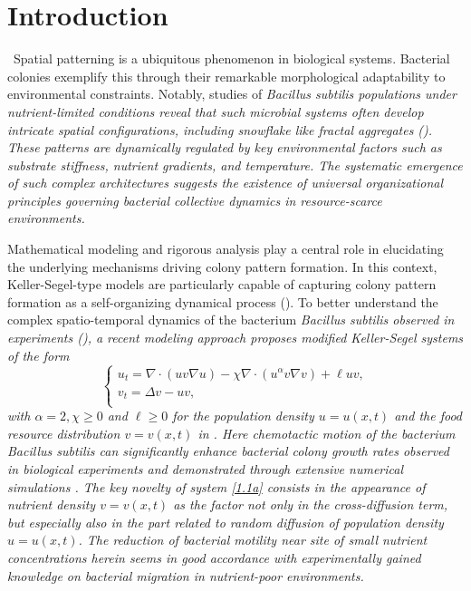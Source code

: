 \documentclass[12pt]{article}
\theoremstyle{plain}
\theoremstyle{definition}
\numberwithin{equation}{section}
\begin{document}
   \section{Introduction}
\setcounter{section}{1}\setcounter{equation}{0} \
Spatial patterning is a ubiquitous phenomenon in biological systems. Bacterial colonies exemplify this through their remarkable morphological adaptability to environmental constraints. Notably, studies of \it{Bacillus subtilis} \rm populations under nutrient-limited conditions reveal that such microbial systems often develop intricate spatial configurations, including snowflake like fractal aggregates (\cite{Fujikawa1992,Fujikawa1989,Fujikawa1990}). These patterns are dynamically regulated by key environmental factors such as substrate stiffness, nutrient gradients, and temperature. The systematic emergence of such complex architectures suggests the existence of universal organizational principles governing bacterial collective dynamics in resource-scarce environments.

Mathematical modeling and rigorous analysis play a central role in elucidating the underlying mechanisms driving colony pattern formation. In this context, Keller-Segel-type models are particularly  capable of capturing colony pattern formation as a self-organizing dynamical process (\cite{Herrero(1997),Hillen(2009)}). To  better understand the complex spatio-temporal dynamics
of the bacterium \it{Bacillus subtilis}  \rm  observed in experiments (\cite{Ohgiwari,Fujikawa1992,Fujikawa1989}), a
recent modeling approach   proposes modified Keller-Segel systems of the form
\begin{equation}\label{1.1a}
\left\{\begin{array}{ll}
		u_{t}=\nabla\cdot(uv\nabla u)-\chi \nabla\cdot(u^{\alpha}v\nabla v)+\ell uv,\\
		v_{t}=\Delta v-uv,\\
	\end{array}
		\right.
\end{equation}
with $\alpha=2, \chi\geq 0$ and $\ell\geq 0$ for the population density $u=u(x,t)$ and the food resource distribution $v=v(x,t)$ in \cite{Leyva2013,Plaza2019,Kawasaki1997}.
Here chemotactic motion of the bacterium \it{Bacillus subtilis} \rm can significantly enhance bacterial colony growth rates  observed in biological experiments and demonstrated through extensive numerical simulations \cite{Leyva2013,Plaza2019}.
 The key novelty of  system   \eqref{1.1a} consists in the appearance of nutrient density $v=v(x,t)$ as the factor not only in the cross-diffusion term, but especially also in the part related to random diffusion
of population density $u=u(x,t)$.
The reduction of bacterial motility near site of small nutrient concentrations herein seems in good accordance with experimentally
gained knowledge on bacterial migration in nutrient-poor environments.
\end{document}

